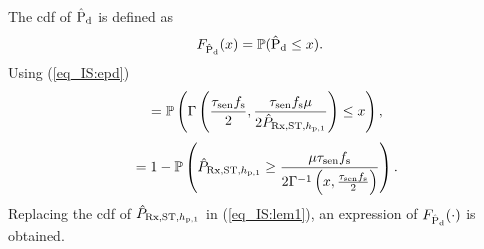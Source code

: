 \begin{IEEEproof}[Solution]
The cdf of $\hat{\text{P}}_{\text{d}}$ is defined as 
\begin{align}
F_{\hat{\text{P}}_{\text{d}}}(x) = \mathbb P(\hat{\text{P}}_{\text{d}} \le x).
\end{align}
Using (\ref{eq_IS:epd})
\begin{align}
\quad =  \mathbb P \left( \Gamma \left( \frac{\tau_{\text{sen}} f_{\text{s}}}{2}, \frac{\tau_{\text{sen}} f_{\text{s}} \mu}{2 \hat{P}_{\text{Rx,ST,$h_{\text{p,1}}$}}} \right) \le x \right), 
\end{align}
\begin{align}
\quad =  1- \mathbb P \left( \hat{P}_{\text{Rx,ST,$h_{\text{p,1}}$}} \ge \frac{\mu \tau_{\text{sen}} f_{\text{s}}}{2 {\Gamma}^{-1}\left( x, \frac{\tau_{\text{sen}} f_{\text{s}}}{2} \right) } \right). \label{eq_IS:lem1} 
\end{align}
Replacing the cdf of $\hat{P}_{\text{Rx,ST,$h_{\text{p,1}}$}}$ in (\ref{eq_IS:lem1}), an expression of $F_{\hat{\text{P}}_{\text{d}}}(\cdot)$ is obtained.
\end{IEEEproof}

